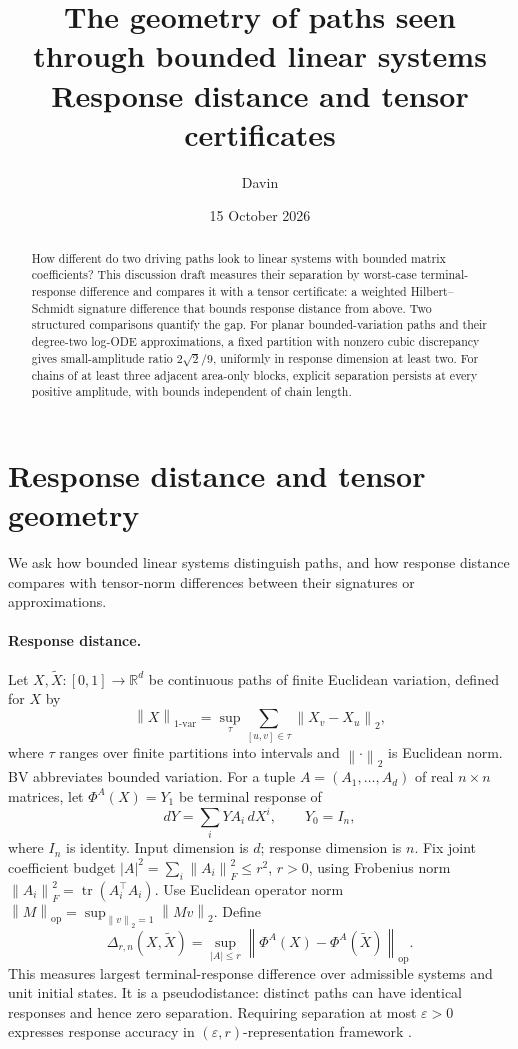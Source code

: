 \documentclass[11pt,a4paper]{article}
\title{\vspace{-12mm}The geometry of paths seen through bounded linear systems\\
\large Response distance and tensor certificates}
\author{Davin}
\date{15 October 2026}
\newcommand{\op}{\mathrm{op}}
\newcommand{\R}{\mathbb R}
\newcommand{\Del}{\Delta}
\newcommand{\norm}[1]{\left\lVert#1\right\rVert}
\begin{document}
\maketitle
\vspace{-6mm}
\begin{abstract}
How different do two driving paths look to linear systems with bounded matrix
coefficients? This discussion draft measures their separation by worst-case
terminal-response difference and compares it with a tensor certificate: a
weighted Hilbert--Schmidt signature difference that bounds response distance
from above. Two structured comparisons quantify the gap. For planar
bounded-variation paths and their degree-two log-ODE approximations, a fixed
partition with nonzero cubic discrepancy gives small-amplitude ratio
\(2\sqrt2/9\), uniformly in response dimension at least two. For chains of at
least three adjacent area-only blocks, explicit separation persists at every
positive amplitude, with bounds independent of chain length.
\end{abstract}

\section{Response distance and tensor geometry}
We ask how bounded linear systems distinguish paths, and how response distance
compares with tensor-norm differences between their signatures or approximations.

\paragraph{Response distance.}
Let \(X,\widetilde X:[0,1]\to\R^d\) be continuous paths of finite Euclidean
variation, defined for \(X\) by
\[
 \norm{X}_{1\text{-var}}
 =\sup_\tau\sum_{[u,v]\in\tau}\norm{X_v-X_u}_2,
\]
where \(\tau\) ranges over finite partitions into intervals and
\(\norm{\cdot}_2\) is Euclidean norm. BV abbreviates bounded variation.
For a tuple \(A=(A_1,\ldots,A_d)\) of real \(n\times n\) matrices, let
\(\Phi^A(X)=Y_1\) be terminal response of
\[
 dY=\sum_i YA_i\,dX^i,\qquad Y_0=I_n,
\]
where \(I_n\) is identity. Input dimension is \(d\); response dimension is
\(n\). Fix joint coefficient budget
\(|A|^2=\sum_i\norm{A_i}_F^2\le r^2\), \(r>0\), using Frobenius norm
\(\norm{A_i}_F^2=\operatorname{tr}(A_i^\top A_i)\).
Use Euclidean operator norm
\(\norm{M}_{\op}=\sup_{\norm{v}_2=1}\norm{Mv}_2\). Define
\begin{equation}\label{eq:criterion}
 \Del_{r,n}(X,\widetilde X)
 =\sup_{|A|\le r}\norm{\Phi^A(X)-\Phi^A(\widetilde X)}_{\op}.
\end{equation}
This measures largest terminal-response difference over admissible systems
and unit initial states. It is a pseudodistance: distinct paths can have
identical responses and hence zero separation. Requiring separation at most
\(\varepsilon>0\) expresses response accuracy in
\((\varepsilon,r)\)-representation framework \cite{ferrucci2026concise}.
\end{document}
